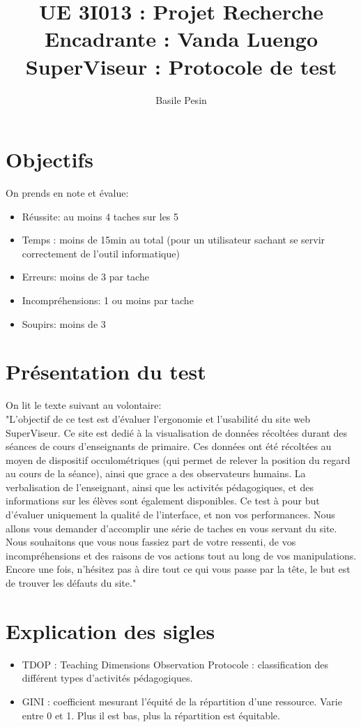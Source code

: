 \documentclass{article}
\title{UE 3I013 : Projet Recherche\\
    Encadrante : Vanda Luengo\\
    SuperViseur : Protocole de test}
\author{Basile Pesin}
\begin{document}
\maketitle

\section{Objectifs}
On prends en note et évalue:
\begin{itemize}
    \item Réussite: au moins 4 taches sur les 5
    \item Temps : moins de 15min au total (pour un utilisateur sachant se servir correctement de l'outil informatique)
    \item Erreurs: moins de 3 par tache
    \item Incompréhensions: 1 ou moins par tache
    \item Soupirs: moins de 3
\end{itemize}

\section{Présentation du test}
On lit le texte suivant au volontaire:\\
"L'objectif de ce test est d'évaluer l'ergonomie et l'usabilité du site web SuperViseur. Ce site est dedié à la visualisation de données récoltées durant des séances de cours d'enseignants de primaire. Ces données ont été récoltées au moyen de dispositif occulométriques (qui permet de relever la position du regard au cours de la séance), ainsi que grace a des observateurs humains. La verbalisation de l'enseignant, ainsi que les activités pédagogiques, et des informations sur les élèves sont également disponibles.
Ce test à pour but d'évaluer uniquement la qualité de l'interface, et non vos performances. Nous allons vous demander d'accomplir une série de taches en vous servant du site. Nous souhaitons que vous nous fassiez part de votre ressenti, de vos incompréhensions et des raisons de vos actions tout au long de vos manipulations. Encore une fois, n'hésitez pas à dire tout ce qui vous passe par la tête, le but est de trouver les défauts du site."

\section{Explication des sigles}
\begin{itemize}
    \item TDOP : Teaching Dimensions Observation Protocole : classification des différent types d'activités pédagogiques.
    \item GINI : coefficient mesurant l'équité de la répartition d'une ressource. Varie entre 0 et 1. Plus il est bas, plus la répartition est équitable.
\end{itemize}
\end{document}
